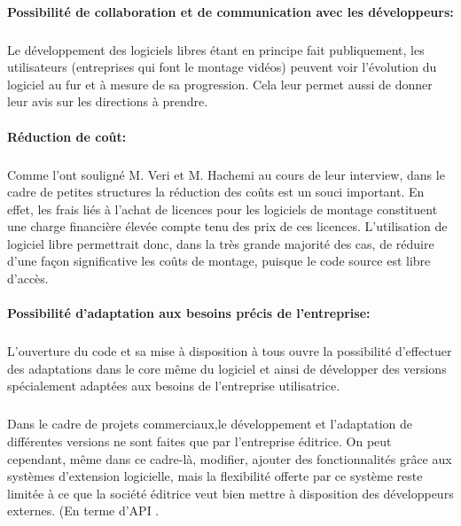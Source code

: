 \paragraph{Possibilité de collaboration et de communication avec les
développeurs:}

  \subparagraph{}

  Le développement des logiciels libres étant en principe fait
  publiquement, les utilisateurs (entreprises qui font le montage
  vidéos) peuvent voir l'évolution du logiciel au fur et à mesure
  de sa progression. Cela leur permet aussi de donner leur avis sur les
  directions à prendre.

\paragraph{Réduction de coût:}

\subparagraph{}

Comme l'ont souligné  M. Veri et M. Hachemi au cours de leur interview,
dans le cadre de petites structures la réduction des coûts est un
souci important.  En effet, les frais liés à l'achat de licences pour
les logiciels de montage constituent une charge financière élevée
compte tenu des prix de ces licences. L'utilisation de logiciel libre
permettrait donc, dans la très grande majorité des cas, de réduire
d'une façon significative les coûts de montage, puisque le code source
est libre d'accès.

\paragraph{Possibilité d'adaptation aux besoins précis de l'entreprise:}

\subparagraph{}

L'ouverture du code et sa mise à disposition à tous ouvre la
possibilité d'effectuer des adaptations dans le core même du logiciel
et ainsi de développer des versions spécialement adaptées aux besoins
de l'entreprise utilisatrice.

\subparagraph{}

Dans le cadre de projets commerciaux,le développement et l'adaptation de
différentes versions ne sont faites que par l'entreprise éditrice. On
peut cependant, même dans ce cadre-là, modifier, ajouter des
fonctionnalités grâce aux systèmes d'extension logicielle, mais
la flexibilité offerte par ce système reste limitée à ce que la
société éditrice veut bien mettre à disposition des développeurs
externes. (En terme d'API  .

